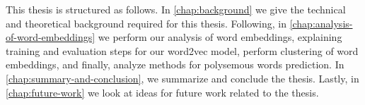 This thesis is structured as follows. In \cref{chap:background} we give the technical and theoretical background required for this thesis. Following, in \cref{chap:analysis-of-word-embeddings} we perform our analysis of word embeddings, explaining training and evaluation steps for our word2vec model, perform clustering of word embeddings, and finally, analyze methods for polysemous words prediction. In \cref{chap:summary-and-conclusion}, we summarize and conclude the thesis. Lastly, in \cref{chap:future-work} we look at ideas for future work related to the thesis.